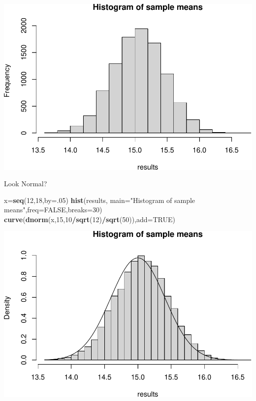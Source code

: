 \documentclass[
]{book}
\newenvironment{Shaded}{\begin{snugshade}}{\end{snugshade}}
\newcommand{\AttributeTok}[1]{\textcolor[rgb]{0.13,0.29,0.53}{#1}}
\newcommand{\ConstantTok}[1]{\textcolor[rgb]{0.56,0.35,0.01}{#1}}
\newcommand{\DecValTok}[1]{\textcolor[rgb]{0.00,0.00,0.81}{#1}}
\newcommand{\FunctionTok}[1]{\textcolor[rgb]{0.13,0.29,0.53}{\textbf{#1}}}
\newcommand{\NormalTok}[1]{#1}
\newcommand{\OtherTok}[1]{\textcolor[rgb]{0.56,0.35,0.01}{#1}}
\newcommand{\SpecialCharTok}[1]{\textcolor[rgb]{0.81,0.36,0.00}{\textbf{#1}}}
\newcommand{\StringTok}[1]{\textcolor[rgb]{0.31,0.60,0.02}{#1}}
\theoremstyle{definition}
\theoremstyle{definition}
\theoremstyle{definition}
\theoremstyle{definition}
\theoremstyle{remark}
\begin{document}
\includegraphics{math340-notes_files/figure-latex/unnamed-chunk-175-1.pdf}

Look Normal?

\begin{Shaded}
\begin{Highlighting}[]
\NormalTok{x}\OtherTok{=}\FunctionTok{seq}\NormalTok{(}\DecValTok{12}\NormalTok{,}\DecValTok{18}\NormalTok{,}\AttributeTok{by=}\NormalTok{.}\DecValTok{05}\NormalTok{)}
\FunctionTok{hist}\NormalTok{(results, }\AttributeTok{main=}\StringTok{"Histogram of sample means"}\NormalTok{,}\AttributeTok{freq=}\ConstantTok{FALSE}\NormalTok{,}\AttributeTok{breaks=}\DecValTok{30}\NormalTok{)}
\FunctionTok{curve}\NormalTok{(}\FunctionTok{dnorm}\NormalTok{(x,}\DecValTok{15}\NormalTok{,}\DecValTok{10}\SpecialCharTok{/}\FunctionTok{sqrt}\NormalTok{(}\DecValTok{12}\NormalTok{)}\SpecialCharTok{/}\FunctionTok{sqrt}\NormalTok{(}\DecValTok{50}\NormalTok{)),}\AttributeTok{add=}\ConstantTok{TRUE}\NormalTok{)}
\end{Highlighting}
\end{Shaded}

\includegraphics{math340-notes_files/figure-latex/unnamed-chunk-176-1.pdf}
\end{document}
